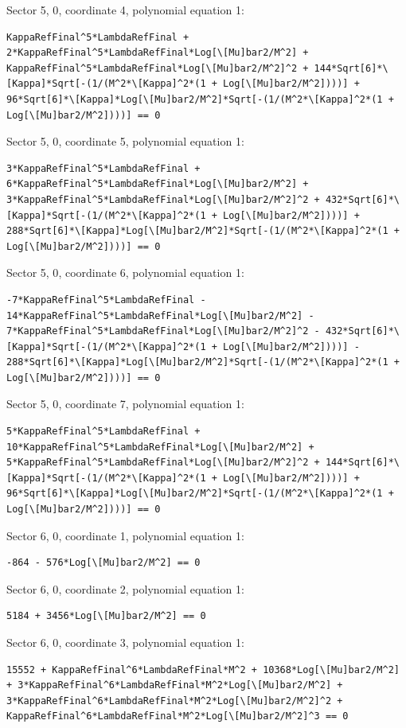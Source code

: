 \documentclass[11pt]{article}
\begin{document}
Sector {5, 0}, coordinate 4, polynomial equation 1:
\begin{verbatim}
KappaRefFinal^5*LambdaRefFinal + 2*KappaRefFinal^5*LambdaRefFinal*Log[\[Mu]bar2/M^2] + KappaRefFinal^5*LambdaRefFinal*Log[\[Mu]bar2/M^2]^2 + 144*Sqrt[6]*\[Kappa]*Sqrt[-(1/(M^2*\[Kappa]^2*(1 + Log[\[Mu]bar2/M^2])))] + 96*Sqrt[6]*\[Kappa]*Log[\[Mu]bar2/M^2]*Sqrt[-(1/(M^2*\[Kappa]^2*(1 + Log[\[Mu]bar2/M^2])))] == 0
\end{verbatim}

Sector {5, 0}, coordinate 5, polynomial equation 1:
\begin{verbatim}
3*KappaRefFinal^5*LambdaRefFinal + 6*KappaRefFinal^5*LambdaRefFinal*Log[\[Mu]bar2/M^2] + 3*KappaRefFinal^5*LambdaRefFinal*Log[\[Mu]bar2/M^2]^2 + 432*Sqrt[6]*\[Kappa]*Sqrt[-(1/(M^2*\[Kappa]^2*(1 + Log[\[Mu]bar2/M^2])))] + 288*Sqrt[6]*\[Kappa]*Log[\[Mu]bar2/M^2]*Sqrt[-(1/(M^2*\[Kappa]^2*(1 + Log[\[Mu]bar2/M^2])))] == 0
\end{verbatim}

Sector {5, 0}, coordinate 6, polynomial equation 1:
\begin{verbatim}
-7*KappaRefFinal^5*LambdaRefFinal - 14*KappaRefFinal^5*LambdaRefFinal*Log[\[Mu]bar2/M^2] - 7*KappaRefFinal^5*LambdaRefFinal*Log[\[Mu]bar2/M^2]^2 - 432*Sqrt[6]*\[Kappa]*Sqrt[-(1/(M^2*\[Kappa]^2*(1 + Log[\[Mu]bar2/M^2])))] - 288*Sqrt[6]*\[Kappa]*Log[\[Mu]bar2/M^2]*Sqrt[-(1/(M^2*\[Kappa]^2*(1 + Log[\[Mu]bar2/M^2])))] == 0
\end{verbatim}

Sector {5, 0}, coordinate 7, polynomial equation 1:
\begin{verbatim}
5*KappaRefFinal^5*LambdaRefFinal + 10*KappaRefFinal^5*LambdaRefFinal*Log[\[Mu]bar2/M^2] + 5*KappaRefFinal^5*LambdaRefFinal*Log[\[Mu]bar2/M^2]^2 + 144*Sqrt[6]*\[Kappa]*Sqrt[-(1/(M^2*\[Kappa]^2*(1 + Log[\[Mu]bar2/M^2])))] + 96*Sqrt[6]*\[Kappa]*Log[\[Mu]bar2/M^2]*Sqrt[-(1/(M^2*\[Kappa]^2*(1 + Log[\[Mu]bar2/M^2])))] == 0
\end{verbatim}

Sector {6, 0}, coordinate 1, polynomial equation 1:
\begin{verbatim}
-864 - 576*Log[\[Mu]bar2/M^2] == 0
\end{verbatim}

Sector {6, 0}, coordinate 2, polynomial equation 1:
\begin{verbatim}
5184 + 3456*Log[\[Mu]bar2/M^2] == 0
\end{verbatim}

Sector {6, 0}, coordinate 3, polynomial equation 1:
\begin{verbatim}
15552 + KappaRefFinal^6*LambdaRefFinal*M^2 + 10368*Log[\[Mu]bar2/M^2] + 3*KappaRefFinal^6*LambdaRefFinal*M^2*Log[\[Mu]bar2/M^2] + 3*KappaRefFinal^6*LambdaRefFinal*M^2*Log[\[Mu]bar2/M^2]^2 + KappaRefFinal^6*LambdaRefFinal*M^2*Log[\[Mu]bar2/M^2]^3 == 0
\end{verbatim}
\end{document}
